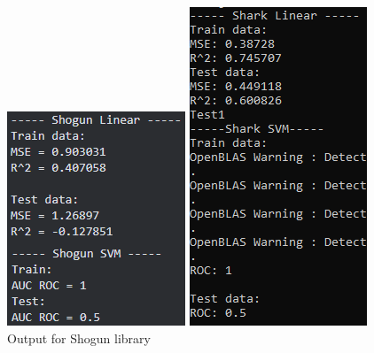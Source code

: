 \begin{figure}[!ht]
	\centering
	\begin{minipage}{0.31\textwidth}
		\centering
		\includegraphics[width=0.8\linewidth]{Rozdzial7/shogun}
		\caption{Output for Shogun library}
		\label{fig:shogun_linear_svm}		
	\end{minipage}%
    \hspace{0.02\textwidth}
	\begin{minipage}{0.31\textwidth}
		\centering
		\includegraphics[width=0.7\linewidth]{Rozdzial7/shark}

\end{minipage}
\end{figure}
